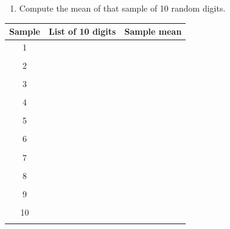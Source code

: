 \documentclass[11pt]{article}
\begin{document}
\begin{enumerate}
\begin{enumerate}
	\item Compute the mean of that sample of 10 random digits. 
	
	\end{enumerate}

\begin{center}	

\begin{tabular}{|c|c||c|}
\hline
Sample & List of 10 digits & Sample mean \\
\hline
1 & \hspace{3in} & \hspace{1in} \\
&&\\ \hline
2 & \hspace{3in} & \hspace{1in} \\
&&\\ \hline
3 & \hspace{3in} & \hspace{1in} \\
&&\\ \hline
4 & \hspace{3in} & \hspace{1in} \\
&&\\ \hline
5 & \hspace{3in} & \hspace{1in} \\
&&\\ \hline
6 & \hspace{3in} & \hspace{1in} \\
&&\\ \hline
7 & \hspace{3in} & \hspace{1in} \\
&&\\ \hline
8 & \hspace{3in} & \hspace{1in} \\
&&\\ \hline
9 & \hspace{3in} & \hspace{1in} \\
&&\\ \hline
10 & \hspace{3in} & \hspace{1in} \\
&&\\ \hline
\end{tabular}


\end{center}
\end{enumerate}
\end{document}
